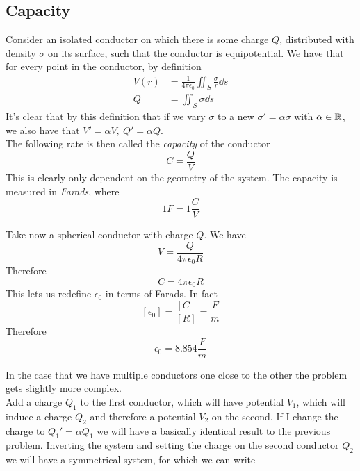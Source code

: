 \documentclass[../electromagnetism]{subfiles}
\begin{document}
\subsection{Capacity}
Consider an isolated conductor on which there is some charge $Q$, distributed with density $\sigma$ on its surface, such that the conductor is equipotential. We have that for every point in the conductor, by definition
\begin{equation}
	\begin{aligned}
		V(r)&=\frac{1}{4\pi\epsilon_0}\iint_S\frac{\sigma}{r}\dd s\\
		Q&=\iint_S\sigma\dd s
	\end{aligned}
	\label{eq:potentialchargecapacity}
\end{equation}
It's clear that by this definition that if we vary $\sigma$ to a new $\sigma'=\alpha\sigma$ with $\alpha\in\operatorname{\mathbb{R}}$, we also have that $V'=\alpha V,\ Q'=\alpha Q$.\\
The following rate is then called the \textit{capacity} of the conductor
\begin{equation}
	C=\frac{Q}{V}
	\label{eq:capacitu}
\end{equation}
This is clearly only dependent on the geometry of the system. The capacity is measured in \textit{Farads}, where
\begin{equation*}
	1\unit{F}=1\unit{\frac{C}{V}}
\end{equation*}
\begin{eg}
	Take now a spherical conductor with charge $Q$. We have
	\begin{equation*}
		V=\frac{Q}{4\pi\epsilon_0R}
	\end{equation*}
	Therefore
	\begin{equation}
		C=4\pi\epsilon_0R
		\label{eq:sphericalcondcap}
	\end{equation}
	This lets us redefine $\epsilon_0$ in terms of Farads. In fact
	\begin{equation*}
		\left[ \epsilon_0 \right]=\frac{\left[ C \right]}{\left[ R \right]}=\unit{\frac{F}{m}}
	\end{equation*}
	Therefore
	\begin{equation}
		\epsilon_0=8.854\unit{\frac{F}{m}}
		\label{eq:epsilon0farad}
	\end{equation}
\end{eg}
In the case that we have multiple conductors one close to the other the problem gets slightly more complex.\\
Add a charge $Q_1$ to the first conductor, which will have potential $V_1$, which will induce a charge $Q_2$ and therefore a potential $V_2$ on the second. If I change the charge to $Q_1'=\alpha Q_1$ we will have a basically identical result to the previous problem. Inverting the system and setting the charge on the second conductor $Q_2$ we will have a symmetrical system, for which we can write
\end{document}

